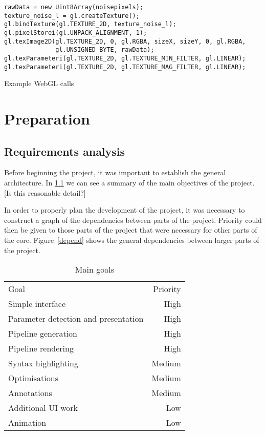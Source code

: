 \documentclass[12pt,twoside,notitlepage]{report}
\begin{document}
\begin{listing}[H]
\begin{verbatim}
rawData = new Uint8Array(noisepixels);
texture_noise_l = gl.createTexture();
gl.bindTexture(gl.TEXTURE_2D, texture_noise_l);
gl.pixelStorei(gl.UNPACK_ALIGNMENT, 1);
gl.texImage2D(gl.TEXTURE_2D, 0, gl.RGBA, sizeX, sizeY, 0, gl.RGBA, 
              gl.UNSIGNED_BYTE, rawData);
gl.texParameteri(gl.TEXTURE_2D, gl.TEXTURE_MIN_FILTER, gl.LINEAR);
gl.texParameteri(gl.TEXTURE_2D, gl.TEXTURE_MAG_FILTER, gl.LINEAR);
\end{verbatim}
\caption{Example WebGL calls}
\label{ugly}
\end{listing}

\cleardoublepage
\chapter{Preparation}

\section{Requirements analysis}
Before beginning the project, it was important to establish the general architecture. In \ref{goals} we can see a summary of the main objectives of the project. [Is this reasonable detail?]

In order to properly plan the development of the project, it was necessary to construct a graph of the dependencies between parts of the project. Priority could then be given to those parts of the project that were necessary for other parts of the core. Figure~\ref{depend} shows the general dependencies between larger parts of the project. 
\begin{table}
\label{goals}
\begin{tabular}{l | r}
Goal & Priority \\
Simple interface & High \\
Parameter detection and presentation & High \\
Pipeline generation & High \\
Pipeline rendering & High \\
Syntax highlighting & Medium \\
Optimisations & Medium \\
Annotations & Medium \\
Additional UI work & Low \\
Animation & Low \\
\end{tabular}
\caption{Main goals}
\end{table}
\end{document}
